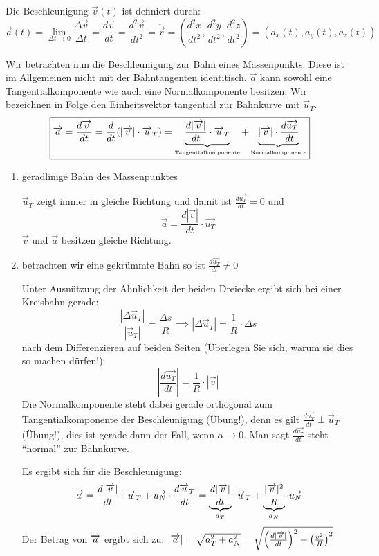 \documentclass[a4paper,10pt]{scrartcl}
\begin{document}
\begin{df}[Beschleunigung]
Die Beschleunigung $\vec v(t)$ ist definiert durch:
\[\vec a(t)=\lim\limits_{\Delta t\rightarrow 0} \frac{\Delta \vec v}{\Delta t} = \frac{d\vec{v}}{dt}=\frac{d^2\vec{v}}{dt^2}=\ddot{\vec r}=(\frac{d^2x}{dt^2},\frac{d^2y}{dt^2},\frac{d^2z}{dt^2})=(a_x(t),a_y(t),a_z(t))\]
\end{df}
Wir betrachten nun die Beschleunigung zur Bahn eines Massenpunkts.  Diese ist im Allgemeinen nicht mit der Bahntangenten identitisch. $\vec a$ kann sowohl eine Tangentialkomponente wie auch eine Normalkomponente besitzen. Wir bezeichnen in Folge den Einheitsvektor tangential zur Bahnkurve mit $\vec u_T$.
\[
\boxed{\overrightarrow{a}=\frac{d\overrightarrow{v}}{dt}=\frac{d}{dt}(|\overrightarrow{v}|\cdot \overrightarrow{u}_T)=\underbrace{\frac{d|\overrightarrow{v}|}{dt}\cdot\overrightarrow{u}_T}_{\text{\tiny{Tangentialkomponente}}}+\underbrace{|\overrightarrow{v}|\cdot \frac{d\overrightarrow{u_T}}{dt}}_{\text{\tiny{Normalkomponente}}}} 
\]
\begin{enumerate}
\item geradlinige Bahn des Massenpunktes
\begin{figure}[h]
\end{figure}
$\vec u_T$ zeigt immer in gleiche Richtung und damit ist $\frac{d\vec{u_T}}{dt}=0$ und
\[
\boxed{\vec a=\frac{d|\vec v|}{dt}\cdot {\vec{u_T}}}
\]
$\vec v$ und $\vec a$ besitzen gleiche Richtung.
\item betrachten wir eine gekrümmte Bahn so ist $\frac{d\vec{u_T}}{dt}\neq 0$
\begin{figure}[h]
\end{figure}
Unter Ausnützung der Ähnlichkeit der beiden Dreiecke ergibt sich bei einer Kreisbahn gerade:
\[
\frac{|\Delta \vec u_T|}{|\vec u_T|}=\frac{\Delta s}{R}\implies |\Delta \vec u_T|=\frac{1}{R}\cdot \Delta s
\]
nach dem Differenzieren auf beiden Seiten (Überlegen Sie sich, warum sie dies so machen dürfen!):
\[
|\frac{d\vec{u_T}}{dt}|=\frac{1}{R}\cdot |\vec v|
\]
Die Normalkomponente steht dabei gerade orthogonal zum Tangentialkomponente der Beschleunigung (Übung!), denn es gilt $\frac{d\vec{u_T}}{dt}\perp   \vec u_T$ (Übung!), dies ist gerade dann der Fall, wenn $\alpha \rightarrow 0$. Man sagt $\frac{d\vec{u_T}}{dt}$ steht "`normal"' zur Bahnkurve.
\begin{figure}[h]
\end{figure}
Es ergibt sich für die Beschleunigung:
\[
\overrightarrow{a}=\frac{d|\overrightarrow{v}|}{dt} \cdot \overrightarrow{u}_T+\overrightarrow{u_N}\cdot \frac{d\overrightarrow{u}_T}{dt}=\underbrace{\frac{d|\overrightarrow{v}|}{dt}}_{a_T} \cdot \overrightarrow{u}_T+\underbrace{\frac{|\overrightarrow{v}|^2}{R}}_{a_N}\cdot \overrightarrow{u_N}
\]
Der Betrag von $\overrightarrow{a}$ ergibt sich zu: $|\overrightarrow{a}|=\sqrt{a_T^2+a_N^2}=\sqrt{\left (\frac{d|\overrightarrow{v}|}{dt}\right )^2+\left ( \frac{v^2}R \right )^2}$
\end{enumerate}
\end{document}

